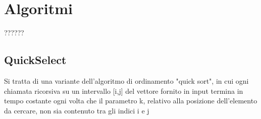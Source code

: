 \section{Algoritmi}
??????

\subsection{QuickSelect}
Si tratta di una variante dell’algoritmo di 
ordinamento "quick sort", in cui ogni chiamata ricorsiva su un intervallo [i,j] del vettore fornito in input termina in tempo costante ogni volta che il parametro k, relativo alla posizione dell’elemento da cercare, non sia contenuto tra gli indici i e j

